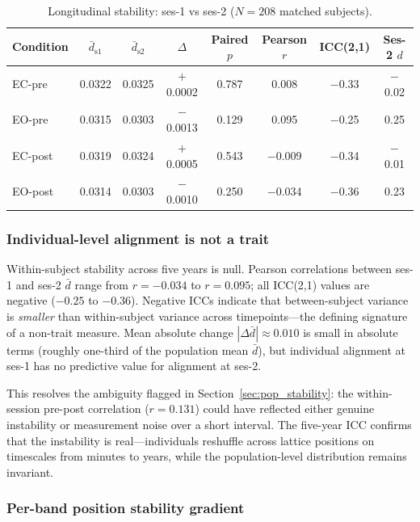 \documentclass[11pt,a4paper]{article}
\begin{document}
\begin{table}[H]
\centering
\caption{Longitudinal stability: ses-1 vs ses-2 ($N = 208$ matched subjects).}
\label{tab:longitudinal}
\begin{tabular}{lccccccc}
\toprule
Condition & $\bar{d}_{\text{s1}}$ & $\bar{d}_{\text{s2}}$ & $\Delta$ & Paired $p$ & Pearson $r$ & ICC(2,1) & Ses-2 $d$ \\
\midrule
EC-pre  & 0.0322 & 0.0325 & $+$0.0002 & 0.787 & 0.008 & $-$0.33 & $-$0.02 \\
EO-pre  & 0.0315 & 0.0303 & $-$0.0013 & 0.129 & 0.095 & $-$0.25 & 0.25 \\
EC-post & 0.0319 & 0.0324 & $+$0.0005 & 0.543 & $-$0.009 & $-$0.34 & $-$0.01 \\
EO-post & 0.0314 & 0.0303 & $-$0.0010 & 0.250 & $-$0.034 & $-$0.36 & 0.23 \\
\bottomrule
\end{tabular}
\end{table}

\subsubsection{Individual-level alignment is not a trait}

Within-subject stability across five years is null. Pearson correlations between ses-1 and ses-2 $\bar{d}$ range from $r = -0.034$ to $r = 0.095$; all ICC(2,1) values are negative ($-0.25$ to $-0.36$). Negative ICCs indicate that between-subject variance is \textit{smaller} than within-subject variance across timepoints---the defining signature of a non-trait measure. Mean absolute change $|\Delta\bar{d}| \approx 0.010$ is small in absolute terms (roughly one-third of the population mean $\bar{d}$), but individual alignment at ses-1 has no predictive value for alignment at ses-2.

This resolves the ambiguity flagged in Section~\ref{sec:pop_stability}: the within-session pre-post correlation ($r = 0.131$) could have reflected either genuine instability or measurement noise over a short interval. The five-year ICC confirms that the instability is real---individuals reshuffle across lattice positions on timescales from minutes to years, while the population-level distribution remains invariant.

\subsubsection{Per-band position stability gradient}
\end{document}
